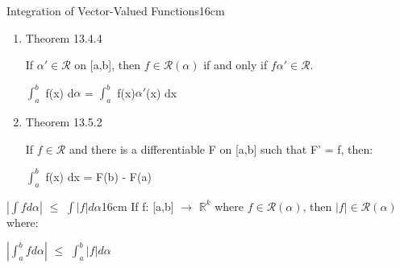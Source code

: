 \begin{definition}{Integration of Vector-Valued Functions}{16cm}
\begin{enumerate}[label=(\alph*), leftmargin=1.5cm, itemsep=0.1cm]
                \hspace{0.5cm}
                $f \in \mathscr{R}(c\alpha_1)$ with
                $\int_a^b$ f d$(c\alpha_1)$
                = $c \int_a^b$ f d$\alpha_1$

            \item {\color{red} Theorem 13.4.4}

                If $\alpha' \in \mathscr{R}$ on [a,b], then
                $f \in \mathscr{R}(\alpha)$ if and only if $f\alpha' \in \mathscr{R}$.

                \hspace{0.5cm}
                $\int_a^b$ f(x) d$\alpha$ = $\int_a^b$ f(x)$\alpha'$(x) dx

            \item {\color{red} Theorem 13.5.2}
            
                If $f \in \mathscr{R}$ and there is a differentiable F
                on [a,b] such that F' = f, then:

                \hspace{0.5cm}
                $\int_a^b$ f(x) dx = F(b) - F(a)
        \end{enumerate}        
    \end{definition}

    \vspace{0.5cm}



    \begin{wtheorem}{$|\int f d\alpha|$ $\leq$ $\int |f| d\alpha$}{16cm}
        If f: [a,b] $\rightarrow$ $\mathbb{R}^k$ where $f \in \mathscr{R}(\alpha)$,
        then $|f| \in \mathscr{R}(\alpha)$ where:

        \hspace{0.5cm}
        $|\int_a^b f d\alpha|$ $\leq$ $\int_a^b |f| d\alpha$        
    \end{wtheorem}
    
